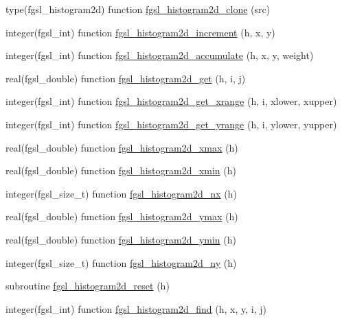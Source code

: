 \begin{DoxyCompactItemize}
\item 
type(fgsl\-\_\-histogram2d) function \hyperlink{histogram_8finc_a9604948b71d92f4538af93c78e588094}{fgsl\-\_\-histogram2d\-\_\-clone} (src)
\item 
integer(fgsl\-\_\-int) function \hyperlink{histogram_8finc_a952f7e1fd0f3c40bd6a7e944b276a16e}{fgsl\-\_\-histogram2d\-\_\-increment} (h, x, y)
\item 
integer(fgsl\-\_\-int) function \hyperlink{histogram_8finc_a3a6eeec0c1b7597dbdf4d1ab4cafbeed}{fgsl\-\_\-histogram2d\-\_\-accumulate} (h, x, y, weight)
\item 
real(fgsl\-\_\-double) function \hyperlink{histogram_8finc_a2bf0d6457cd1a1ea900d74e0a3eee4d6}{fgsl\-\_\-histogram2d\-\_\-get} (h, i, j)
\item 
integer(fgsl\-\_\-int) function \hyperlink{histogram_8finc_af5344e677a177dafbbae2dbeef296aec}{fgsl\-\_\-histogram2d\-\_\-get\-\_\-xrange} (h, i, xlower, xupper)
\item 
integer(fgsl\-\_\-int) function \hyperlink{histogram_8finc_ae8df4a522731cb9a11e12f5b67477d73}{fgsl\-\_\-histogram2d\-\_\-get\-\_\-yrange} (h, i, ylower, yupper)
\item 
real(fgsl\-\_\-double) function \hyperlink{histogram_8finc_ad4a38fb97da9239b35d7cb87a5bfd317}{fgsl\-\_\-histogram2d\-\_\-xmax} (h)
\item 
real(fgsl\-\_\-double) function \hyperlink{histogram_8finc_a9e077ca4a5ae72020dc7c4888686cf11}{fgsl\-\_\-histogram2d\-\_\-xmin} (h)
\item 
integer(fgsl\-\_\-size\-\_\-t) function \hyperlink{histogram_8finc_aaeab41d83342219214c6a491f1a787c1}{fgsl\-\_\-histogram2d\-\_\-nx} (h)
\item 
real(fgsl\-\_\-double) function \hyperlink{histogram_8finc_adc8f77aa4dcb1669c67f89007d0dcd88}{fgsl\-\_\-histogram2d\-\_\-ymax} (h)
\item 
real(fgsl\-\_\-double) function \hyperlink{histogram_8finc_ae0c415b04bd1b13d137b79cdf58c7bb4}{fgsl\-\_\-histogram2d\-\_\-ymin} (h)
\item 
integer(fgsl\-\_\-size\-\_\-t) function \hyperlink{histogram_8finc_a38af849a97c19f225fec10a9eafb2d7b}{fgsl\-\_\-histogram2d\-\_\-ny} (h)
\item 
subroutine \hyperlink{histogram_8finc_a386fdbb01672ba3530a25e570706a3da}{fgsl\-\_\-histogram2d\-\_\-reset} (h)
\item 
integer(fgsl\-\_\-int) function \hyperlink{histogram_8finc_a11b26e23f4e370a0c15abe24db476a71}{fgsl\-\_\-histogram2d\-\_\-find} (h, x, y, i, j)

\end{DoxyCompactItemize}

